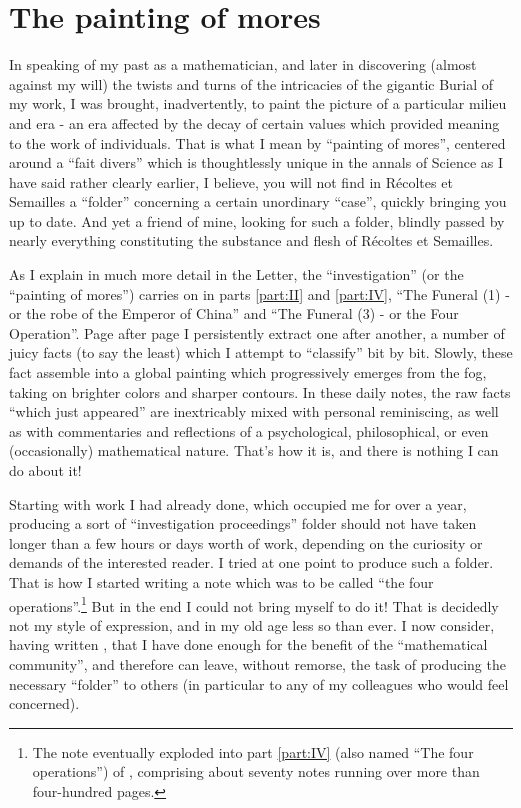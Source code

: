 \section{The painting of mores}

In speaking of my past as a mathematician, and later in discovering (almost against my
will) the twists and turns of the intricacies of the gigantic Burial of my work, I was
brought, inadvertently, 
to paint the picture of a particular milieu and era - an era
affected by the decay of certain values
which provided meaning to the work of individuals.
That is what I mean by
``painting of mores'', centered around a 
``fait divers'' which is thoughtlessly unique in the annals of Science
as I have said rather clearly earlier, I believe, you will not find in 
R\'ecoltes et Semailles
a ``folder'' concerning a certain unordinary ``case'', quickly bringing you up to date.
And yet a friend of mine, looking for such a folder, 
blindly passed by nearly
everything constituting the substance and flesh of 
R\'ecoltes et Semailles.

As I explain in much more detail in the Letter, the ``investigation'' (or the ``painting
of mores'') carries on in 
parts \ref{part:II} and \ref{part:IV},
``The Funeral (1)
- or the robe of the Emperor of China'' and 
``The Funeral (3) - or the Four Operation''. 
Page after page I persistently extract one after another, 
a number of juicy facts (to say the least) which I attempt to ``classify''
bit by bit. Slowly, these fact
assemble into a global painting which progressively 
emerges from the fog, taking on brighter colors and 
sharper contours.
In these daily notes, the raw facts
``which just appeared''
are inextricably mixed with personal
reminiscing, as well as with commentaries and reflections of a psychological,
philosophical, or even (occasionally) mathematical nature.
That's how it is, and there is nothing I can do about it!

Starting with work I had already done, 
which occupied me for over a year, producing 
a sort of ``investigation proceedings'' folder
should not have taken longer than a few hours 
or days worth of work, depending
on the curiosity or demands of the interested reader.
I tried at one point to produce such a folder. 
That is how I started writing a note which was to be called ``the four
operations''.\footnote{The note eventually exploded into part \ref{part:IV}
(also named ``The four operations'') of \rec, comprising about seventy notes 
running over more than four-hundred pages.}
But in the end I could not bring myself to do it!
That is decidedly
not my style of expression, and in my old age less so than ever.
I now consider, having written \rec, 
that I have done enough for the benefit of the ``mathematical community'', 
and therefore can leave, without remorse, 
the task of producing 
the necessary ``folder'' to others (in particular to any of my
colleagues who would feel concerned). 

